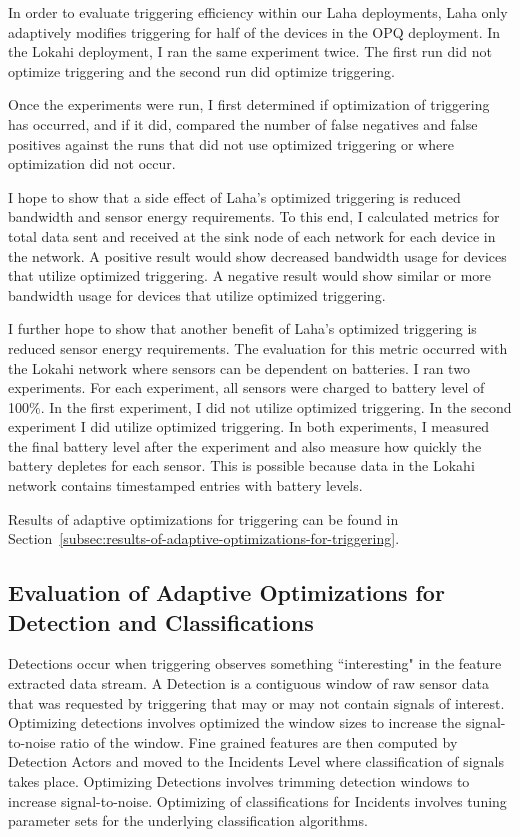 In order to evaluate triggering efficiency within our Laha deployments, Laha only adaptively modifies triggering for half of the devices in the OPQ deployment. In the Lokahi deployment, I  ran the same experiment twice. The first run did not optimize triggering and the second run did optimize triggering.

Once the experiments were run, I first determined if optimization of triggering has occurred, and if it did, compared the number of false negatives and false positives against the runs that did not use optimized triggering or where optimization did not occur.

I hope to show that a side effect of Laha's optimized triggering is reduced bandwidth and sensor energy requirements. To this end, I calculated metrics for total data sent and received at the sink node of each network for each device in the network. A positive result would show decreased bandwidth usage for devices that utilize optimized triggering. A negative result would show similar or more bandwidth usage for devices that utilize optimized triggering.

I further hope to show that another benefit of Laha's optimized triggering is reduced sensor energy requirements. The evaluation for this metric occurred with the Lokahi network where sensors can be dependent on batteries. I ran two experiments. For each experiment, all sensors were charged to battery level of 100\%. In the first experiment, I did not utilize optimized triggering. In the second experiment I did utilize optimized triggering. In both experiments, I measured the final battery level after the experiment and also measure how quickly the battery depletes for each sensor. This is possible because data in the Lokahi network contains timestamped entries with battery levels.

Results of adaptive optimizations for triggering can be found in Section~\ref{subsec:results-of-adaptive-optimizations-for-triggering}.

\subsection{Evaluation of Adaptive Optimizations for Detection and Classifications}\label{subsec:evaluation-of-adaptive-optimizations-for-detection-and-classifications}
Detections occur when triggering observes something ``interesting" in the feature extracted data stream. A Detection is a contiguous window of raw sensor data that was requested by triggering that may or may not contain signals of interest. Optimizing detections involves optimized the window sizes to increase the signal-to-noise ratio of the window. Fine grained features are then computed by Detection Actors and moved to the Incidents Level where classification of signals takes place. Optimizing Detections involves trimming detection windows to increase signal-to-noise. Optimizing of classifications for Incidents involves tuning parameter sets for the underlying classification algorithms.

